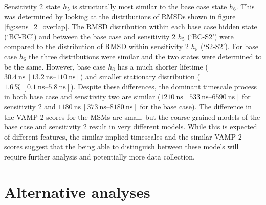 Sensitivity 2 state $h_{5}$ is structurally most similar to the base case state $h_{6}$. This was determined by looking at the distributions of RMSDs shown in figure \ref{fig:sens_2_overlap}. The RMSD distribution within each base case hidden state (`BC-BC') and between the base case and sensitivity 2 $h_{5}$ (`BC-S2') were compared to the distribution of RMSD within sensitivity 2 $h_{5}$ (`S2-S2'). For base case $h_{6}$ the three distributions were similar and the two states were determined to be the same.  However, base case $h_{6}$ has a much shorter lifetime ($\SI{30.4}{\nano\second}\ [\SIrange[range-phrase=\text{--}]{13.2}{110}{\nano\second}]$) and smaller stationary distribution ($\SI{1.6}{\percent}\ [\SIrange[range-phrase=\text{--}]{0.1}{5.8}{\nano\second}]$). Despite these differences, the dominant timescale process in both base case and sensitivity two are similar ($\SI{1210}{\nano\second}\ [\SIrange[range-phrase=\text{--}]{533}{6590}{\nano\second}]$ for sensitivity 2 and  $\SI{1180}{\nano\second}\ [\SIrange[range-phrase=\text{--}]{373}{8180}{\nano\second}]$ for the base case). The difference in the VAMP-2 scores for the MSMs are small, but the coarse grained models of the base case and sensitivity 2 result in very different models. While this is expected of different features, the similar implied timescales  and the similar VAMP-2 scores suggest that the being able to distinguish between these models will require further analysis and potentially more data collection. 


\section{Alternative analyses}\label{sec:outlook}

